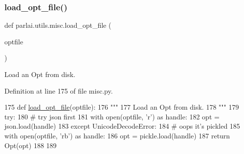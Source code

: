\subsubsection{\texorpdfstring{load\+\_\+opt\+\_\+file()}{load\_opt\_file()}}
{\footnotesize\ttfamily def parlai.\+utils.\+misc.\+load\+\_\+opt\+\_\+file (\begin{DoxyParamCaption}\item[{}]{optfile }\end{DoxyParamCaption})}

\begin{DoxyVerb}Load an Opt from disk.
\end{DoxyVerb}
 

Definition at line 175 of file misc.\+py.


\begin{DoxyCode}
175 \textcolor{keyword}{def }\hyperlink{namespaceparlai_1_1utils_1_1misc_a7c97ef3250327bc549ac652a481be0cf}{load\_opt\_file}(optfile):
176     \textcolor{stringliteral}{"""}
177 \textcolor{stringliteral}{    Load an Opt from disk.}
178 \textcolor{stringliteral}{    """}
179     \textcolor{keywordflow}{try}:
180         \textcolor{comment}{# try json first}
181         with open(optfile, \textcolor{stringliteral}{'r') as handle:}
182 \textcolor{stringliteral}{            opt = json.load(handle)}
183 \textcolor{stringliteral}{    }\textcolor{keywordflow}{except} UnicodeDecodeError:
184         \textcolor{comment}{# oops it's pickled}
185         with open(optfile, \textcolor{stringliteral}{'rb'}) \textcolor{keyword}{as} handle:
186             opt = pickle.load(handle)
187     \textcolor{keywordflow}{return} Opt(opt)
188 
189 
\end{DoxyCode}
\mbox{\label{namespaceparlai_1_1utils_1_1misc_ac8ca45e62ca906d9b6e5026588a5d2a2}} 
